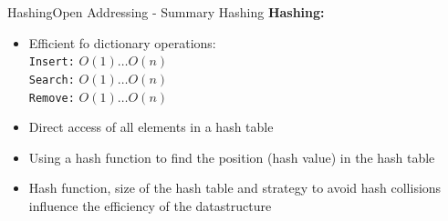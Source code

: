 
\begin{frame}{Hashing}{Open Addressing - Summary Hashing}
  \textbf{Hashing:}
  \begin{itemize}
    \item<2->
      Efficient fo dictionary operations:\\
      \hspace{1.5em}\texttt{Insert:} $O(1) \dots O(n)$\\
      \hspace{1.5em}\texttt{Search:} $O(1) \dots O(n)$\\
      \hspace{1.5em}\texttt{Remove:} $O(1) \dots O(n)$
    \item<3->
      Direct access of all elements in a hash table 
    \item<4->
      Using a hash function to find the position (hash value) in the hash table
    \item<5->
      Hash function, size of the hash table and strategy to
      avoid hash collisions influence the efficiency of the
      datastructure
  \end{itemize}
\end{frame}
